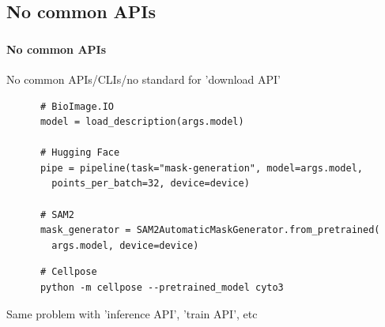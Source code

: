 \def\slidetitle{No common APIs}

\subsection{\slidetitle}
\begin{frame}[containsverbatim]
  \frametitle{\sectiontitle}
  \framesubtitle{\slidetitle}

  No common APIs/CLIs/no standard for 'download API'

  \begin{listing}[H]
    \begin{verbatim}
      # BioImage.IO
      model = load_description(args.model)

      # Hugging Face
      pipe = pipeline(task="mask-generation", model=args.model,
        points_per_batch=32, device=device)

      # SAM2
      mask_generator = SAM2AutomaticMaskGenerator.from_pretrained(
        args.model, device=device)
    \end{verbatim}

    \begin{verbatim}
      # Cellpose
      python -m cellpose --pretrained_model cyto3
    \end{verbatim}
  \end{listing}

  Same problem with 'inference API', 'train API', etc

\end{frame}

\def\slidetitle{Our approach}

